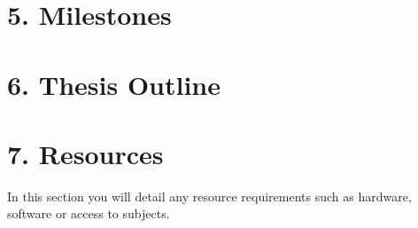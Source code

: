 \documentclass[11pt, a4paper, twoside, openright]{report}
\begin{document}
\section*{5. Milestones}

\section*{6. Thesis Outline}

\section*{7. Resources}

In this section you will detail any resource requirements such as
hardware, software or access to subjects.

\backmatter

%


\end{document}
